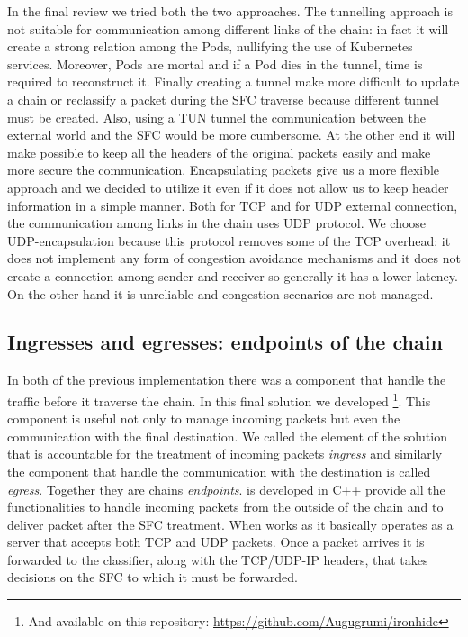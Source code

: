 \vspace*{1cm}

\noindent In the final review we tried both the two approaches. The tunnelling
approach is not suitable for communication among different links of the chain:
in fact it will create a strong relation among the Pods, nullifying the use of
Kubernetes services. Moreover, Pods are mortal and if a Pod dies in the tunnel,
time is required to reconstruct it. Finally creating a tunnel make more
difficult to update a chain or reclassify a packet during the SFC traverse
because different tunnel must be created. Also, using a TUN tunnel the
communication between the external world and the SFC would be more cumbersome.
At the other end it will make possible to keep all the headers of the original
packets easily and make more secure the communication. Encapsulating packets
give us a more flexible approach and we decided to utilize it even if it does
not allow us to keep header information in a simple manner. Both for TCP and for
UDP external connection, the communication among links in the chain uses UDP
protocol. We choose UDP-encapsulation because this protocol removes some of the
TCP overhead: it does not implement any form of congestion avoidance mechanisms
and it does not create a connection among sender and receiver so generally it
has a lower latency. On the other hand it is unreliable and congestion scenarios
are not managed.

\subsection{Ingresses and egresses: endpoints of the chain}
\label{chap:impl:subsec:endpoints}
In both of the previous implementation there was a component that handle the
traffic before it traverse the chain. In this final solution we developed 
\ironhide{}\footnote{And available on this repository: 
\url{https://github.com/Augugrumi/ironhide}}. This
component is useful not only to manage incoming packets but even the
communication with the final destination. We called the element of the solution
that is accountable for the treatment of incoming packets \emph{ingress} and
similarly the component that handle the communication with the destination is
called \emph{egress}. Together they are chains \emph{endpoints}. \ironhide{} is
developed in C++ provide all the functionalities to handle incoming packets from
the outside of the chain and to deliver packet after the SFC treatment. When 
\ironhide{} works as \ingress{} it basically operates as a server that accepts
both TCP and UDP packets. Once a packet arrives it is forwarded to the
classifier, along with the TCP/UDP-IP headers, that takes decisions on the SFC
to which it must be forwarded.

